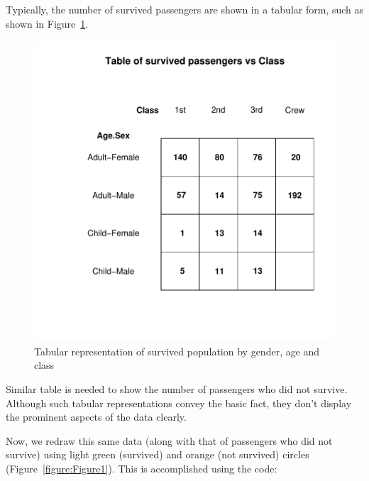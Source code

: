 \documentclass[a4paper]{report}
\begin{document}
\begin{article}


Typically, the number of survived passengers are shown in a
tabular form, such as shown in Figure~\ref{figure:Table}.

\begin{figure}
\includegraphics[width=\textwidth]{Table.pdf}
\caption{\label{figure:Table}
Tabular representation of survived population by gender, age and class}
\end{figure}

Similar table is needed to show the number of passengers who did
not survive. Although such tabular representations convey the basic
fact, they don't display the prominent aspects of the data clearly.

Now, we redraw this same data (along with that of passengers who did
not survive) using light green (survived) and orange (not survived) circles
(Figure~\ref{figure:Figure1}).  This is accomplished using the code:


\end{article}
\end{document}
